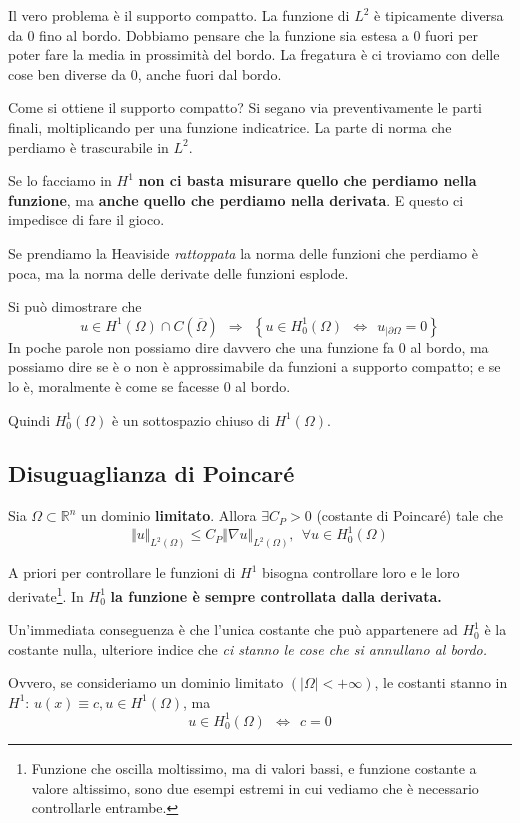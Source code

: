 \documentclass[10pt,a4paper,twoside,openright]{book}
\begin{document}
Il vero problema è il supporto compatto. La funzione di $L^{2}$ è tipicamente diversa da $0$ fino al bordo. Dobbiamo pensare che la funzione sia estesa a $0$ fuori per poter fare la media in prossimità del bordo. La fregatura è ci troviamo con delle cose ben diverse da $0$, anche fuori dal bordo.

Come si ottiene il supporto compatto? Si segano via preventivamente le parti finali, moltiplicando per una funzione indicatrice. La parte di norma che perdiamo è trascurabile in $L^{2}$.

Se lo facciamo in $H^{1}$ \textbf{non ci basta misurare quello che perdiamo nella funzione}, ma \textbf{anche quello che perdiamo nella derivata}. E questo ci impedisce di fare il gioco.

Se prendiamo la Heaviside \textit{rattoppata} la norma delle funzioni che perdiamo è poca, ma la norma delle derivate delle funzioni esplode.



Si può dimostrare che
\begin{equation*}
	u\in H^{1}(\Omega) \cap C(\overline{\Omega }) \ \ \Rightarrow \ \ \left\{u\in H^{1}_{0}(\Omega) \ \ \Leftrightarrow \ \ u_{|\partial \Omega } =0\right\}
\end{equation*}
In poche parole non possiamo dire davvero che una funzione fa $0$ al bordo, ma possiamo dire se è o non è approssimabile da funzioni a supporto compatto; e se lo è, moralmente è come se facesse $0$ al bordo.

Quindi $H^{1}_{0}(\Omega)$ è un sottospazio chiuso di $H^{1}(\Omega)$.

\subsection{Disuguaglianza di Poincaré}
\begin{theorem}
	 Sia $\Omega \subset \mathbb{R}^{n}$ un dominio \textbf{limitato}. Allora $\exists C_{P}  >0$ (costante di Poincaré) tale che
	\begin{equation}
		\Vert u\Vert _{L^{2}(\Omega)} \leqslant C_{P}\Vert \nabla u\Vert _{L^{2}(\Omega)} ,\ \ \forall u\in H^{1}_{0}(\Omega)
	\end{equation}
\end{theorem}
A priori per controllare le funzioni di $H^{1}$ bisogna controllare loro e le loro derivate\footnote{Funzione che oscilla moltissimo, ma di valori bassi, e funzione costante a valore altissimo, sono due esempi estremi in cui vediamo che è necessario controllarle entrambe.}. In $H^{1}_{0}$ \textbf{la funzione è sempre controllata dalla derivata.}
\begin{oss}
	Un'immediata conseguenza è che l'unica costante che può appartenere ad $H^{1}_{0}$ è la costante nulla, ulteriore indice che \textit{ci stanno le cose che si annullano al bordo.}

	Ovvero, se consideriamo un dominio limitato $(|\Omega |< +\infty)$, le costanti stanno in $H^{1} $: $u(x) \equiv c,u\in H^{1}(\Omega)$,  ma
	\begin{equation*}
		u\in H_{0}^{1}(\Omega) \ \ \Leftrightarrow \ \ c=0
	\end{equation*}
\end{oss}
\end{document}
